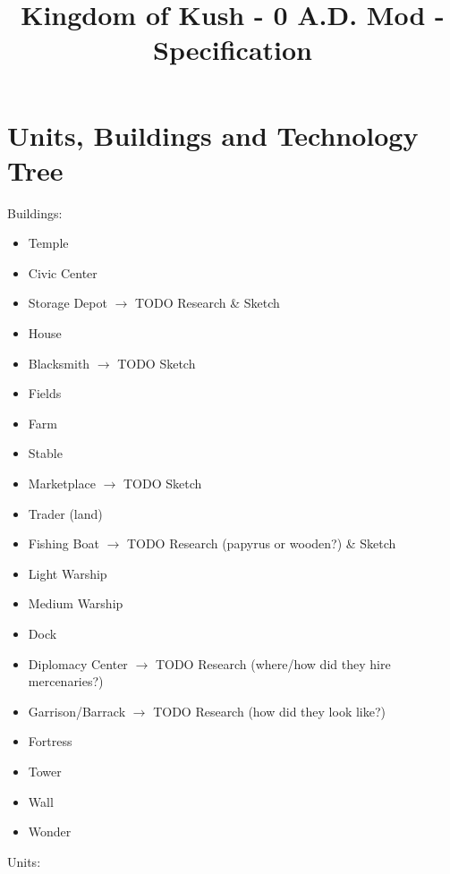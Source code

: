 \documentclass[a4paper,12pt]{scrreprt}
\title{Kingdom of Kush - 0 A.D. Mod - Specification}
\begin{document}
\maketitle


\tableofcontents

\chapter{Units, Buildings and Technology Tree}

Buildings:

\begin{itemize}
	\item Temple
	\item Civic Center
	\item Storage Depot $\rightarrow$ TODO Research \& Sketch
	\item House
	\item Blacksmith $\rightarrow$ TODO Sketch
	\item Fields
	\item Farm
	\item Stable
	\item Marketplace $\rightarrow$ TODO Sketch
	\item Trader (land)
	\item Fishing Boat $\rightarrow$ TODO Research (papyrus or wooden?) \& Sketch
	\item Light Warship
	\item Medium Warship
	\item Dock
	\item Diplomacy Center $\rightarrow$ TODO Research (where/how did they hire mercenaries?)
	\item Garrison/Barrack $\rightarrow$ TODO Research (how did they look like?)
	\item Fortress
	\item Tower
	\item Wall
	\item Wonder
\end{itemize}

Units:
\end{document}
